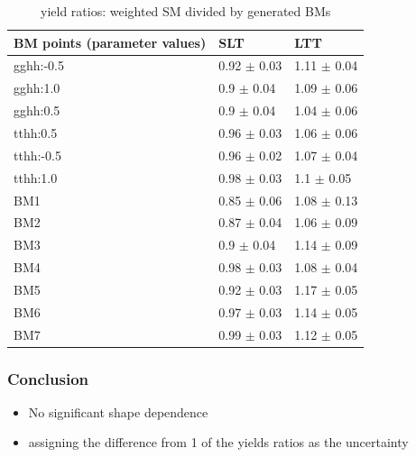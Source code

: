 \documentclass[twoside,11pt]{beamer}
\begin{document}
\begin{frame}   

\begin{table}
    \begin{tabular}{l | l | l|}
    BM points (parameter values)   & SLT & LTT \\
        \hline
        \hline
       gghh:-0.5& 0.92 $\pm$ 0.03 & 1.11 $\pm$ 0.04 \\
       gghh:1.0& 0.9 $\pm$ 0.04 & 1.09 $\pm$ 0.06 \\
       gghh:0.5& 0.9 $\pm$ 0.04 & 1.04 $\pm$ 0.06 \\
       tthh:0.5& 0.96 $\pm$ 0.03 & 1.06 $\pm$ 0.06 \\
       tthh:-0.5& 0.96 $\pm$ 0.02 & 1.07 $\pm$ 0.04 \\
       tthh:1.0& 0.98 $\pm$ 0.03 & 1.1 $\pm$ 0.05 \\
        BM1& 0.85 $\pm$ 0.06 & 1.08 $\pm$ 0.13 \\
        BM2& 0.87 $\pm$ 0.04 & 1.06 $\pm$ 0.09 \\
        BM3& 0.9 $\pm$ 0.04 & 1.14 $\pm$ 0.09 \\
        BM4& 0.98 $\pm$ 0.03 & 1.08 $\pm$ 0.04 \\
        BM5& 0.92 $\pm$ 0.03 & 1.17 $\pm$ 0.05 \\
        BM6& 0.97 $\pm$ 0.03 & 1.14 $\pm$ 0.05 \\
        BM7& 0.99 $\pm$ 0.03 & 1.12 $\pm$ 0.05 \\
    \end{tabular}
    \caption{yield ratios: weighted SM divided by generated BMs}
    \end{table}

\end{frame}   


\begin{frame}
    \frametitle{Conclusion}
    \begin{itemize}
    \item No significant shape dependence
    \item assigning the difference from 1 of the yields ratios as the uncertainty
    \end{itemize}
\end{frame} 
\end{document}

